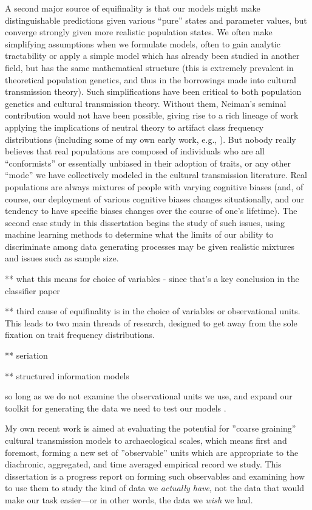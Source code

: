 A second major source of equifinality is that our models might make distinguishable predictions given various ``pure'' states and parameter values, but converge strongly given more realistic population states.  We often make simplifying assumptions when we formulate models, often to gain analytic tractability or apply a simple model which has already been studied in another field, but has the same mathematical structure (this is extremely prevalent in theoretical population genetics, and thus in the borrowings made into cultural transmission theory).  Such simplifications have been critical to both population genetics and cultural transmission theory.  Without them, Neiman's \citeyearpar{Neiman1995} seminal contribution would not have been possible, giving rise to a rich lineage of work applying the implications of neutral theory to artifact class frequency distributions (including some of my own early work, e.g., \citealp{Lipo1997}).  But nobody really believes that real populations are composed of individuals who are all ``conformists'' or essentially unbiased in their adoption of traits, or any other ``mode'' we have collectively modeled in the cultural transmission literature.  Real populations are always mixtures of people with varying cognitive biases (and, of course, our deployment of various cognitive biases changes situationally, and our tendency to have specific biases changes over the course of one's lifetime).  The second case study in this dissertation begins the study of such issues, using machine learning methods to determine what the limits of our ability to discriminate among data generating processes may be given realistic mixtures and issues such as sample size.  


** what this means for choice of variables - since that's a key conclusion in the classifier paper

** third cause of equifinality is in the choice of variables or observational units.  This leads to two main threads of research, designed to get away from the sole fixation on trait frequency distributions.  

** seriation

** structured information models  




so long as we do not examine the observational units we use, and expand our toolkit for generating the data we need to test our models \citep{tostevin2019content}.  



My own recent work is aimed at evaluating the potential for ''coarse graining'' cultural transmission models to archaeological scales, which means first and foremost, forming a new set of ''observable'' units which are appropriate to the diachronic, aggregated, and time averaged empirical record we study.  This dissertation is a progress report on forming such observables and examining how to use them to study the kind of data we \emph{actually have}, not the data that would make our task easier---or in other words, the data we \emph{wish} we had. 







